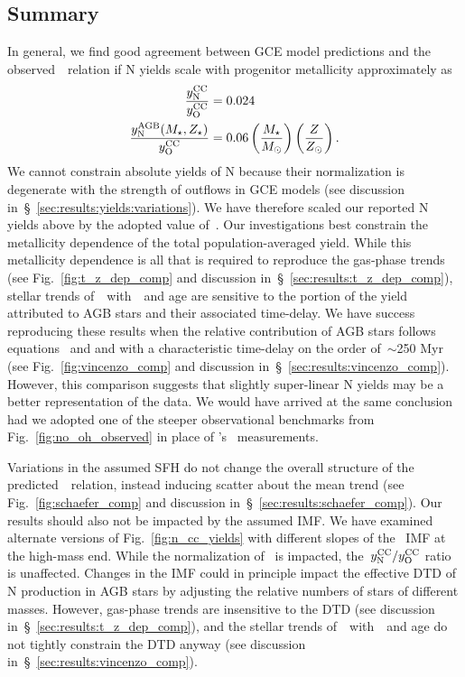 \documentclass[ms.tex]{subfiles}
\begin{document}
{\color{red}
\subsection{Summary}
\label{sec:results:summary}
In general, we find good agreement between GCE model predictions and the
observed~\ohno~relation if N yields scale with progenitor metallicity
approximately as
\begin{subequations}\begin{align}
\frac{y_\text{N}^\text{CC}}{y_\text{O}^\text{CC}} &= 0.024
\label{eq:advocated_n_cc_yield}
\\
\frac{y_\text{N}^\text{AGB}(M_\star, Z_\star)}{y_\text{O}^\text{CC}} &= 0.06
\left(\frac{M_\star}{M_\odot}\right)\left(\frac{Z}{Z_\odot}\right).
\label{eq:advocated_n_agb_yield}
\end{align}\end{subequations}
We cannot constrain absolute yields of N because their normalization is
degenerate with the strength of outflows in GCE models
(see discussion in~\S~\ref{sec:results:yields:variations}).
We have therefore scaled our reported N yields above by the adopted value
of~.
Our investigations best constrain the metallicity dependence of the total
population-averaged yield.
While this metallicity dependence is all that is required to
reproduce the gas-phase trends (see Fig.~\ref{fig:t_z_dep_comp} and discussion
in~\S~\ref{sec:results:t_z_dep_comp}), stellar trends of~\no~with~\ofe~and age
are sensitive to the portion of the yield attributed to AGB stars and their
associated time-delay.
We have success reproducing these results when the relative contribution of
AGB stars follows equations~ and
 and with a characteristic time-delay on the
order of~$\sim$250 Myr (see Fig.~\ref{fig:vincenzo_comp} and discussion
in~\S~\ref{sec:results:vincenzo_comp}).
However, this comparison suggests that slightly super-linear N yields may be a
better representation of the data.
We would have arrived at the same conclusion had we adopted one of the steeper
observational benchmarks from Fig.~\ref{fig:no_oh_observed} in place of
\citeauthor{Dopita2016}'s~\citeyearpar{Dopita2016} measurements.
\par
Variations in the assumed SFH do not change the overall structure of the
predicted~\ohno~relation, instead inducing scatter about the mean trend (see
Fig.~\ref{fig:schaefer_comp} and discussion
in~\S~\ref{sec:results:schaefer_comp}).
Our results should also not be impacted by the assumed IMF.
We have examined alternate versions of Fig.~\ref{fig:n_cc_yields} with
different slopes of the~\citet{Kroupa2001} IMF at the high-mass end.
While the normalization of~ is impacted, the~$y_\text{N}^\text{CC} / y_\text{O}^\text{CC}$ ratio
is unaffected.
Changes in the IMF could in principle impact the effective DTD of N production
in AGB stars by adjusting the relative numbers of stars of different masses.
However, gas-phase trends are insensitive to the DTD (see discussion
in~\S~\ref{sec:results:t_z_dep_comp}), and the stellar trends
of~\no~with~\ofe~and age do not tightly constrain the DTD anyway (see
discussion in~\S~\ref{sec:results:vincenzo_comp}).
}
\end{document}
